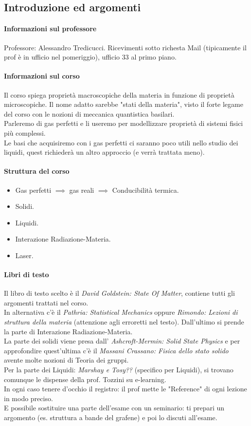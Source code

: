 \subsection{Introduzione ed argomenti}%
\paragraph{Informazioni sul professore}%
Professore: Alessandro Tredicucci. Ricevimenti sotto richesta Mail (tipicamente il prof è in ufficio nel pomeriggio), ufficio 33 al primo piano.
\paragraph{Informazioni sul corso}%
Il corso spiega proprietà macroscopiche della materia in funzione di proprietà microscopiche. Il nome adatto sarebbe "stati della materia", visto il forte legame del corso con le nozioni di meccanica quantistica basilari. \\
Parleremo di gas perfetti e li useremo per modellizzare proprietà di sistemi fisici più complessi.\\
Le basi che acquisiremo con i gas perfetti ci saranno poco utili nello studio dei liquidi, quest richiederà un altro approccio (e verrà trattata meno).\\
\paragraph{Struttura del corso}%
\begin{itemize}
	\item Gas perfetti $\implies$ gas reali $\implies$ Conducibilità termica.
	\item Solidi. 
	\item Liquidi.
	\item Interazione Radiazione-Materia.
	\item Laser.
\end{itemize}
\paragraph{Libri di testo}%
Il libro di testo scelto è il \textit{David Goldstein: State Of Matter}, contiene tutti gli argomenti trattati nel corso.\\ 
In alternativa c'è il  \textit{Pathria: Statistical Mechanics} oppure \textit{Rimondo: Lezioni di struttura della materia} (attenzione agli erroretti nel testo). Dall'ultimo si prende la parte di Interazione Radiazione-Materia.\\ 
La parte dei solidi viene presa dall' \textit{Ashcroft-Mermin: Solid State Physics} e per approfondire quest'ultima c'è il \textit{Massani Crassano: Fisica dello stato solido} avente molte nozioni di Teoria dei gruppi.\\
Per la parte dei Liquidi: \textit{Marshay e Tosy??} (specifico per Liquidi), si trovano comunque le dispense della prof. Tozzini su e-learning.\\
In ogni caso tenere d'occhio il registro: il prof mette le "Reference" di ogni lezione in modo preciso.\\
E possibile sostituire una parte dell'esame con un seminario: ti prepari un argomento (es. struttura a bande del grafene) e poi lo discuti all'esame.
